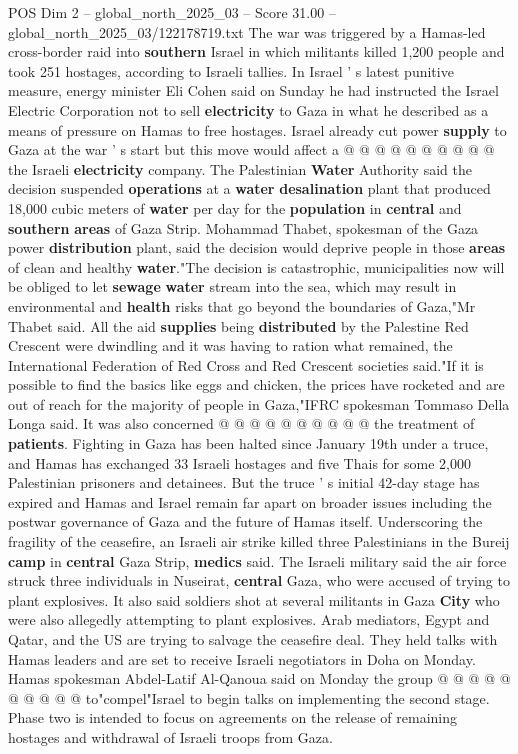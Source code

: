 \begin{textsample}{POS Dim 2 – global\_north\_2025\_03 – Score 31.00 – global\_north\_2025\_03/122178719.txt}
The war was triggered by a Hamas-led cross-border raid into \textbf{southern} Israel in which militants killed 1,200 people and took 251 hostages, according to Israeli tallies.
In Israel ' s latest punitive measure, energy minister Eli Cohen said on Sunday he had instructed the Israel Electric Corporation not to sell \textbf{electricity} to Gaza in what he described as a means of pressure on Hamas to free hostages.
Israel already cut power \textbf{supply} to Gaza at the war ' s start but this move would affect a @ @ @ @ @ @ @ @ @ @ the Israeli \textbf{electricity} company.
The Palestinian \textbf{Water} Authority said the decision suspended \textbf{operations} at a \textbf{water} \textbf{desalination} plant that produced 18,000 cubic meters of \textbf{water} per day for the \textbf{population} in \textbf{central} and \textbf{southern} \textbf{areas} of Gaza Strip.
Mohammad Thabet, spokesman of the Gaza power \textbf{distribution} plant, said the decision would deprive people in those \textbf{areas} of clean and healthy \textbf{water}."The decision is catastrophic, municipalities now will be obliged to let \textbf{sewage} \textbf{water} stream into the sea, which may result in environmental and \textbf{health} risks that go beyond the boundaries of Gaza,"Mr Thabet said.
All the aid \textbf{supplies} being \textbf{distributed} by the Palestine Red Crescent were dwindling and it was having to ration what remained, the International Federation of Red Cross and Red Crescent societies said."If it is possible to find the basics like eggs and chicken, the prices have rocketed and are out of reach for the majority of people in Gaza,"IFRC spokesman Tommaso Della Longa said.
It was also concerned @ @ @ @ @ @ @ @ @ @ the treatment of \textbf{patients}.
Fighting in Gaza has been halted since January 19th under a truce, and Hamas has exchanged 33 Israeli hostages and five Thais for some 2,000 Palestinian prisoners and detainees.
But the truce ' s initial 42-day stage has expired and Hamas and Israel remain far apart on broader issues including the postwar governance of Gaza and the future of Hamas itself.
Underscoring the fragility of the ceasefire, an Israeli air strike killed three Palestinians in the Bureij \textbf{camp} in \textbf{central} Gaza Strip, \textbf{medics} said.
The Israeli military said the air force struck three individuals in Nuseirat, \textbf{central} Gaza, who were accused of trying to plant explosives.
It also said soldiers shot at several militants in Gaza \textbf{City} who were also allegedly attempting to plant explosives.
Arab mediators, Egypt and Qatar, and the US are trying to salvage the ceasefire deal.
They held talks with Hamas leaders and are set to receive Israeli negotiators in Doha on Monday.
Hamas spokesman Abdel-Latif Al-Qanoua said on Monday the group @ @ @ @ @ @ @ @ @ @ to"compel"Israel to begin talks on implementing the second stage.
Phase two is intended to focus on agreements on the release of remaining hostages and withdrawal of Israeli troops from Gaza.


\end{textsample}
